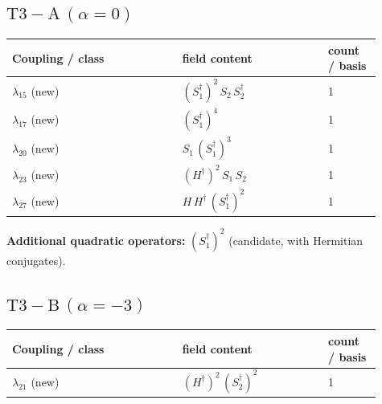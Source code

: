 \documentclass[9pt,a4paper]{article}
\begin{document}
\subsection*{$ \mathrm{T3-A}\,(\alpha=0) $}
\begin{longtable}{@{}p{0.42\linewidth}p{0.36\linewidth}p{0.13\linewidth}@{}}
\toprule
Coupling / class & field content & count / basis\\
\midrule
\endhead
$\lambda_{15}$ (new) & $\left(S_1^\dagger\right)^{2}\, S_2\, S_2^\dagger$ & 1 \\
$\lambda_{17}$ (new) & $\left(S_1^\dagger\right)^{4}$ & 1 \\
$\lambda_{20}$ (new) & $S_1\, \left(S_1^\dagger\right)^{3}$ & 1 \\
$\lambda_{23}$ (new) & $\left(H^\dagger\right)^{2}\, S_1\, S_2$ & 1 \\
$\lambda_{27}$ (new) & $H\, H^\dagger\, \left(S_1^\dagger\right)^{2}$ & 1 \\
\bottomrule
\end{longtable}
\textbf{Additional quadratic operators:}
$\left(S_1^\dagger\right)^{2}$ (candidate, with Hermitian conjugates).
\subsection*{$ \mathrm{T3-B}\,(\alpha=-3) $}
\begin{longtable}{@{}p{0.42\linewidth}p{0.36\linewidth}p{0.13\linewidth}@{}}
\toprule
Coupling / class & field content & count / basis\\
\midrule
\endhead
$\lambda_{21}$ (new) & $\left(H^\dagger\right)^{2}\, \left(S_2^\dagger\right)^{2}$ & 1 \\
\bottomrule
\end{longtable}
\end{document}
